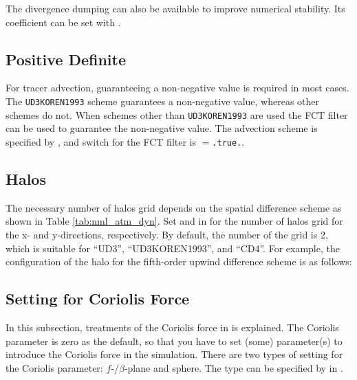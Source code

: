 The divergence dumping can also be available to improve numerical stability.
Its coefficient can be set with .


\subsection{Positive Definite}

For tracer advection, guaranteeing a non-negative value is required in most cases.\\
The \verb|UD3KOREN1993| scheme guarantees a non-negative value, whereas other schemes do not.
When schemes other than \verb|UD3KOREN1993| are used the FCT filter can be used to guarantee the non-negative value.
The advection scheme is specified by , and switch for the FCT filter is $=$\verb|.true.|.


\subsection{Halos}

The necessary number of halos grid depends on the spatial difference scheme as shown in Table \ref{tab:nml_atm_dyn}.
Set  and  in  for the number of halos grid for the x- and y-directions, respectively.
By default, the number of the grid is 2, which is suitable for ``UD3'', ``UD3KOREN1993'', and ``CD4''.
For example, the configuration of the halo for the fifth-order upwind difference scheme is as follows:



\subsection{Setting for Coriolis Force} \label{subsec:coriolis}

In this subsection, treatments of the Coriolis force in \scalerm is explained.
The Coriolis parameter is zero as the default, so that you have to set (some) parameter(s) to introduce the Coriolis force in the simulation.
There are two types of setting for the Coriolis parameter: $f$-/$\beta$-plane and sphere.
The type can be specified by  in .

